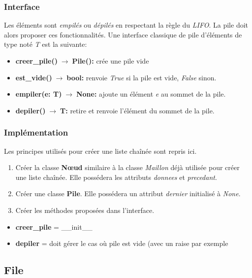 \documentclass[a4paper,11pt]{article}
\begin{document}
\begin{Form}
\subsubsection{Interface}
Les éléments sont \emph{empilés} ou \emph{dépilés} en respectant la règle du \emph{LIFO}. La pile doit alors proposer ces fonctionnalités. Une interface classique de pile  d'éléments de type noté \emph{T} est la suivante:
\begin{itemize}
\item \textbf{creer\_pile()$\;\rightarrow\;$Pile():} crée une pile vide
\item \textbf{est\_vide()$\;\rightarrow\;$bool:} renvoie \emph{True} si la pile est vide, \emph{False} sinon.
\item \textbf{empiler(e: T)$\;\rightarrow\;$None:} ajoute un élément \emph{e} au sommet de la pile.
\item \textbf{depiler()$\;\rightarrow\;$T:} retire et renvoie l'élément du sommet de la pile.
\end{itemize}
\subsubsection{Implémentation}
Les principes utilisés pour créer une liste chaînée sont repris ici.
\begin{activite}
\begin{enumerate}
\item Créer la classe \textbf{Nœud} similaire à la classe \emph{Maillon} déjà utilisée pour créer une liste chaînée. Elle possédera les attributs \emph{donnees} et \emph{precedant}.
\item Créer une classe \textbf{Pile}. Elle possédera un attribut \emph{dernier} initialisé à \emph{None}.
\item Créer les méthodes proposées dans l'interface.
\end{enumerate}
\end{activite}
\begin{commentprof}
\begin{itemize}
\item \textbf{creer\_pile} = \_\_init\_\_
\item \textbf{depiler} = doit gérer le cas où pile est vide (avec un raise par exemple
\end{itemize}
\end{commentprof}
\subsection{File}

\end{Form}
\end{document}
